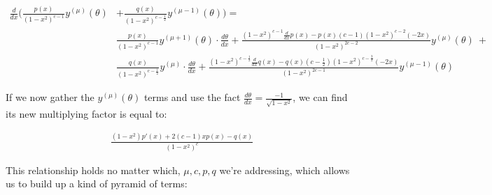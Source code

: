 \documentclass[10pt]{article}
\begin{document}
\begin{align*}
\frac{d}{dx} \Big( \frac{p(x)}{(1-x^2)^{c-1}} y^{(\mu)}(\theta) &+ \frac{q(x)}{(1-x^2)^{c -\frac{1}{2}}} y^{(\mu-1)}(\theta) \Big) = \\
&\frac{p(x)}{(1-x^2)^{c-1}} y^{(\mu+1)}(\theta) \cdot \frac{d\theta}{dx} + \frac{(1 - x^2)^{c-1} \frac{d}{dx} p(x) - p(x)(c-1)(1-x^2)^{c-2}(-2x)}{(1-x^2)^{2c - 2}} y^{(\mu)}(\theta)\ +\\
&\frac{q(x)}{(1-x^2)^{c-\frac{1}{2}}} y^{(\mu)} \cdot \frac{d\theta}{dx} + \frac{(1 - x^2)^{c-\frac{1}{2}} \frac{d}{dx} q(x) - q(x)(c-\frac{1}{2})(1-x^2)^{c-\frac{3}{2}}(-2x)}{(1-x^2)^{2c - 1}} y^{(\mu-1)}(\theta)
\end{align*} 

If we now gather the $y^{(\mu)}(\theta)$ terms and use the fact $\frac{d\theta}{dx} = \frac{-1}{\sqrt{1-x^2}}$, we can find its new multiplying factor is equal to:

\begin{align*}
\frac{(1-x^2)p'(x) + 2(c-1)xp(x) - q(x)}{(1 - x^2)^c}
\end{align*}

This relationship holds no matter which, $\mu, c, p, q$ we're addressing, which allows us to build up a kind of pyramid of terms:
\end{document}
